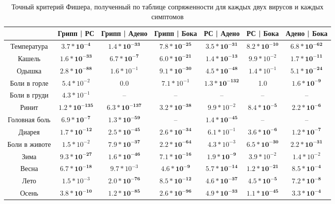 \documentclass{article}
\begin{document}
\begin{table}[H]
\begin{tabular}{|c|c|c|c|c|c|c|}
\hline
              & Грипп | РС      & Грипп | Адено   & Грипп | Бока   & РС | Адено      & РС | Бока      & Адено | Бока   \\ \hline
Температура   & $\mathbf{3.7*10^{-4}}$  & $\mathbf{1.4*10^{-33}}$  & $\mathbf{7.8*10^{-25}}$ & $\mathbf{3.5*10^{-31}}$  & $\mathbf{8.2*10^{-10}}$ & $\mathbf{6.8*10^{-62}}$ \\ \hline
Кашель        & $\mathbf{1.6*10^{-33}}$  & $\mathbf{6.7*10^{-7}}$   & $\mathbf{6.0*10^{-21}}$ & $\mathbf{1.4*10^{-13}}$  & $9.9*10^{-2}$  & $\mathbf{1.7*10^{-11}}$ \\ \hline
Одышка        & $\mathbf{2.8*10^{-88}}$  & $1.6*10^{-1}$   & $\mathbf{9.1*10^{-30}}$ & $\mathbf{4.5*10^{-48}}$  & $1.4*10^{-1}$  & $\mathbf{5.1*10^{-24}}$ \\ \hline
Боли в горле  & $5.4*10^{-2}$   & $\mathbf{0.0}$             & ${7.1*10^{-1}}$  & $\mathbf{1.3*10^{-132}}$ & 1.0            & $\mathbf{1.6*10^{-9}}$  \\ \hline
Боли в груди  & $4.3*10^{-1}$   & –               & –              & –               & –              & –              \\ \hline
Ринит         & $\mathbf{1.2*10^{-135}}$ & $\mathbf{6.3*10^{-137}}$ & $\mathbf{3.2*10^{-38}}$ & $9.9*10^{-2}$   & $\mathbf{8.4*10^{-5}}$  & $\mathbf{2.2*10^{-6}}$  \\ \hline
Головная боль & $\mathbf{6.9*10^{-7}}$   & $\mathbf{1.3*10^{-59}}$  & –              & $\mathbf{1.4*10^{-45}}$  & –              & –              \\ \hline
Диарея        & $\mathbf{1.7*10^{-12}}$  & $\mathbf{2.5*10^{-45}}$  & $\mathbf{2.6*10^{-34}}$ & $6.1*10^{-1}$   & $\mathbf{3.6*10^{-6}}$  & $\mathbf{1.2*10^{-7}}$  \\ \hline
Боли в животе & $1.5*10^{-2}$   & $\mathbf{7.9*10^{-37}}$  & $\mathbf{2.2*10^{-64}}$ & $4.3*10^{-3}$   & $\mathbf{6.5*10^{-30}}$ & $\mathbf{2.2*10^{-31}}$ \\ \hline
Зима          & $\mathbf{9.3*10^{-27}}$  & $\mathbf{1.6*10^{-46}}$  & $\mathbf{7.1*10^{-16}}$ & $\mathbf{1.9*10^{-9}}$   & $3.9*10^{-2}$  & $1.4*10^{-2}$  \\ \hline
Весна         & $\mathbf{6.7*10^{-18}}$  & $9.7*10^{-3}$   & $\mathbf{4.6*10^{-9}}$  & $\mathbf{5.7*10^{-14}}$  & $\mathbf{1.2*10^{-21}}$ & $\mathbf{8.5*10^{-4}}$  \\ \hline
Лето          & $1.5*10^{-3}$   & $\mathbf{2.0*10^{-76}}$  & $\mathbf{8.5*10^{-12}}$ & $\mathbf{4.6*10^{-37}}$  & $\mathbf{4.5*10^{-5}}$  & $\mathbf{7.2*10^{-8}}$  \\ \hline
Осень         & $\mathbf{3.8*10^{-10}}$  & $\mathbf{1.2*10^{-85}}$  & $\mathbf{2.6*10^{-96}}$ & $\mathbf{4.9*10^{-33}}$  & $\mathbf{1.1*10^{-45}}$ & $\mathbf{3.3*10^{-4}}$  \\ \hline
\end{tabular}
\caption{Точный критерий Фишера, полученный по таблице сопряженности для каждых двух вирусов и каждых симптомов}
\label{tabl:7.1}
\end{table}
\end{document}
